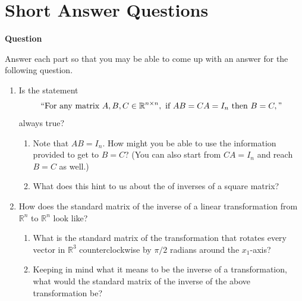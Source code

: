 \documentclass[10pt, titlepage]{article}
\newcounter{question}
\newenvironment{newquestion}
{
	\noindent\textbf{Question \thequestion}
}
{
\stepcounter{question}
\par
}
\begin{document}
\section{\centering Short Answer Questions}
\begin{newquestion}
	Answer each part so that you may be able to come up with an answer for the following question.
	\begin{enumerate}
		\item Is the statement \[\text{``For any matrix} \ A,B,C \in \mathbb{R}^{n \times n}, \ \text{if} \ AB = CA = I_n \ \text{then} \ B = C,"\] always true?
			\begin{enumerate}
				\item Note that \(AB = I_n\). How might you be able to use the information provided to get to \(B = C\)? (You can also start from 
					\(CA = I_n\) and reach \(B = C\) as well.)
				\item What does this hint to us about the of inverses of a square matrix?
			\end{enumerate}

		\item How does the standard matrix of the inverse of a linear transformation from \(\mathbb{R}^n\) to \(\mathbb{R}^n\) look like?
			\begin{enumerate}
				\item What is the standard matrix of the transformation that rotates every vector in \(\mathbb{R}^3\) counterclockwise by \(\pi/2\) radians
					around the \(x_1\)-axis?
				\item Keeping in mind what it means to be the inverse of a transformation, what would the standard matrix of the inverse of the above
					transformation be?
			\end{enumerate}


\end{enumerate}
\end{newquestion}
\end{document}
